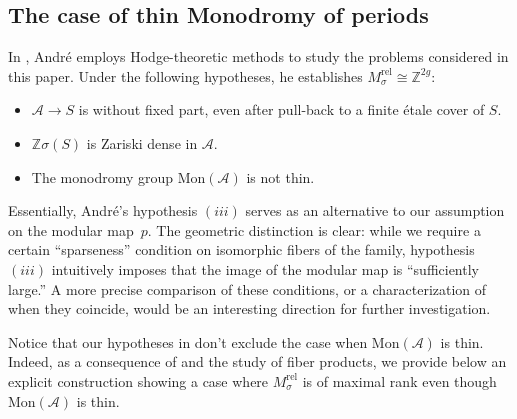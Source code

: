 \documentclass[10 pt,a4paper]{article}
\theoremstyle{plain}
\theoremstyle{definition}
\theoremstyle{named}
\newcommand{\cA}{\mathcal A}
\begin{document}
\subsection{The case of thin Monodromy of periods}\label{sec:3.5}
In \cite{And_mon}, André employs Hodge-theoretic methods to study the problems considered in this paper. Under the following hypotheses, he establishes  $M_\sigma^{\textrm{rel}} \cong \mathbb{Z}^{2g}$:
\begin{itemize}
    \item[$(i)$] $\cA \to S$ is without fixed part, even after pull-back to a finite \'etale cover of $S$.

    \item[$(ii)$] $\mathbb Z\sigma(S)$ is Zariski dense in $\mathcal A$.

    \item[$(iii)$] The monodromy group $\textrm{Mon}(\cA)$ is not thin.
\end{itemize}
Essentially, André's hypothesis $(iii)$ serves as an alternative to our assumption on the modular map~$p$. The geometric distinction is clear: while we require a certain ``sparseness'' condition on isomorphic fibers of the family, hypothesis $(iii)$ intuitively imposes that the image of the modular map is ``sufficiently large.'' A more precise comparison of these conditions, or a characterization of when they coincide, would be an interesting direction for further investigation.

Notice that our hypotheses in  don't exclude the case when $\textrm{Mon}(\cA)$ is thin. Indeed, as a consequence of  and the study of fiber products, we provide below an explicit construction showing a case where  $M_\sigma^\textrm{rel}$ is of maximal rank even though $\textrm{Mon}(\cA)$ is thin.
\end{document}
